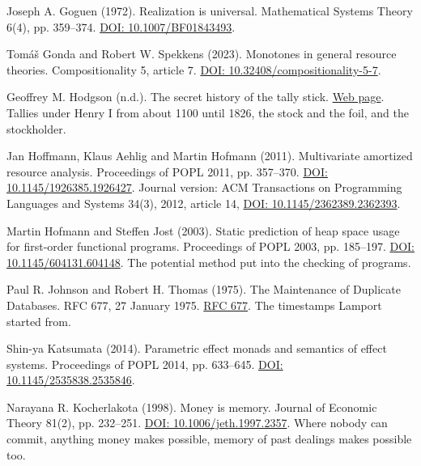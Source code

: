 \noindent Joseph A. Goguen (1972). Realization is universal. Mathematical Systems Theory 6(4), pp. 359--374. \href{https://doi.org/10.1007/BF01843493}{DOI: 10.1007/BF01843493}.
\par\medskip

\noindent Tom\'a\v{s} Gonda and Robert W. Spekkens (2023). Monotones in general resource theories. Compositionality 5, article 7. \href{https://doi.org/10.32408/compositionality-5-7}{DOI: 10.32408/compositionality-5-7}.
\par\medskip

\noindent Geoffrey M. Hodgson (n.d.). The secret history of the tally stick. \href{https://www.geoffreymhodgson.uk/secret-history-of-tally-stick}{Web page}. Tallies under Henry I from about 1100 until 1826, the stock and the foil, and the stockholder.
\par\medskip

\noindent Jan Hoffmann, Klaus Aehlig and Martin Hofmann (2011). Multivariate amortized resource analysis. Proceedings of POPL 2011, pp. 357--370. \href{https://doi.org/10.1145/1926385.1926427}{DOI: 10.1145/1926385.1926427}. Journal version: ACM Transactions on Programming Languages and Systems 34(3), 2012, article 14, \href{https://doi.org/10.1145/2362389.2362393}{DOI: 10.1145/2362389.2362393}.
\par\medskip

\noindent Martin Hofmann and Steffen Jost (2003). Static prediction of heap space usage for first-order functional programs. Proceedings of POPL 2003, pp. 185--197. \href{https://doi.org/10.1145/604131.604148}{DOI: 10.1145/604131.604148}. The potential method put into the checking of programs.
\par\medskip

\noindent Paul R. Johnson and Robert H. Thomas (1975). The Maintenance of Duplicate Databases. RFC 677, 27 January 1975. \href{https://www.rfc-editor.org/rfc/rfc677.html}{RFC 677}. The timestamps Lamport started from.
\par\medskip

\noindent Shin-ya Katsumata (2014). Parametric effect monads and semantics of effect systems. Proceedings of POPL 2014, pp. 633--645. \href{https://doi.org/10.1145/2535838.2535846}{DOI: 10.1145/2535838.2535846}.
\par\medskip

\noindent Narayana R. Kocherlakota (1998). Money is memory. Journal of Economic Theory 81(2), pp. 232--251. \href{https://doi.org/10.1006/jeth.1997.2357}{DOI: 10.1006/jeth.1997.2357}. Where nobody can commit, anything money makes possible, memory of past dealings makes possible too.
\par\medskip

